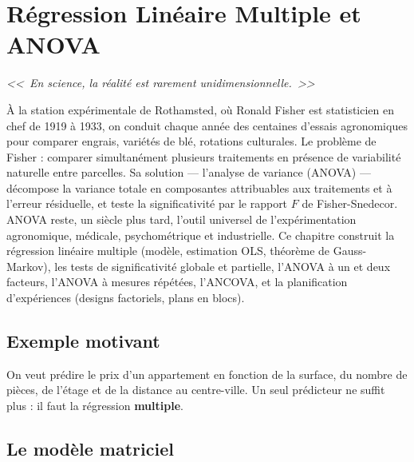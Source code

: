 \chapter{R\'egression Lin\'eaire Multiple et ANOVA}
\label{ch:regression-multiple}

\begin{center}
\textit{<<~En science, la r\'ealit\'e est rarement unidimensionnelle.~>>}
\end{center}

À la station expérimentale de Rothamsted, où Ronald Fisher est statisticien en chef de 1919 à 1933, on conduit chaque année des centaines d'essais agronomiques pour comparer engrais, variétés de blé, rotations culturales. Le problème de Fisher : comparer simultanément plusieurs traitements en présence de variabilité naturelle entre parcelles. Sa solution --- l'analyse de variance (ANOVA) --- décompose la variance totale en composantes attribuables aux traitements et à l'erreur résiduelle, et teste la significativité par le rapport $F$ de Fisher-Snedecor. ANOVA reste, un siècle plus tard, l'outil universel de l'expérimentation agronomique, médicale, psychométrique et industrielle. Ce chapitre construit la régression linéaire multiple (modèle, estimation OLS, théorème de Gauss-Markov), les tests de significativité globale et partielle, l'ANOVA à un et deux facteurs, l'ANOVA à mesures répétées, l'ANCOVA, et la planification d'expériences (designs factoriels, plans en blocs).

\section{Exemple motivant}

On veut pr\'edire le prix d'un appartement en fonction de la surface, du nombre de pi\`eces, de l'\'etage et de la distance au centre-ville. Un seul pr\'edicteur ne suffit plus : il faut la r\'egression \textbf{multiple}.

\section{Le mod\`ele matriciel}

